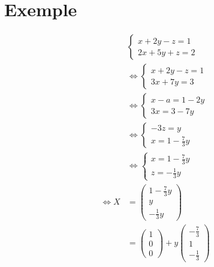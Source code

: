 \documentclass[../main.tex]{subfiles}
\begin{document}
\setcounter{section}{60}
\section{Exemple}
\begin{align*}
    &\begin{cases}
        x + 2y - z = 1 \\
        2x + 5y + z = 2 
    \end{cases} \\
    &\Leftrightarrow 
    \begin{cases}
        x + 2y - z = 1 \\
        3x + 7y = 3
    \end{cases} \\
    &\Leftrightarrow
    \begin{cases}
        x - a = 1 - 2y \\
        3x = 3 - 7y
    \end{cases} \\
    &\Leftrightarrow
    \begin{cases}
        -3z = y \\
        x = 1 - \frac{7}{3}y
    \end{cases} \\
    &\Leftrightarrow
    \begin{cases}
        x = 1 - \frac{7}{3}y \\
        z = -\frac{1}{3}y
    \end{cases} \\
    \Leftrightarrow
    X &= 
    \begin{pmatrix}
        1 - \frac{7}{3}y \\
        y \\
        -\frac{1}{3}y
    \end{pmatrix} \\
    &= 
    \begin{pmatrix}
        1 \\
        0 \\
        0
    \end{pmatrix}
    + y
    \begin{pmatrix}
        -\frac{7}{3} \\
        1 \\
        -\frac{1}{3}
    \end{pmatrix} \\
\end{align*}
\end{document}
